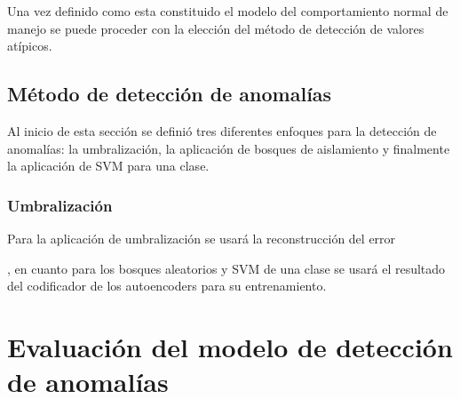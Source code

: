 \vspace{5mm} %

Una vez definido como esta constituido el modelo del comportamiento normal de manejo se puede proceder con la elecci\'{o}n del m\'{e}todo de detecci\'{o}n de valores at\'{i}picos.

\subsection{M\'{e}todo de detecci\'{o}n de anomal\'{i}as}

Al inicio de esta secci\'{o}n se defini\'{o} tres diferentes enfoques para la detecci\'{o}n de anomal\'{i}as: la umbralizaci\'{o}n, la aplicaci\'{o}n de bosques de aislamiento y finalmente la aplicaci\'{o}n de SVM para una clase.

\vspace{5mm} %

\subsubsection{Umbralizaci\'{o}n}

Para la aplicaci\'{o}n de umbralizaci\'{o}n se usar\'{a} la reconstrucci\'{o}n del error

, en cuanto para los bosques aleatorios y SVM de una clase se usar\'{a} el resultado del codificador de los autoencoders para su entrenamiento.


\section{Evaluaci\'{o}n del modelo de detecci\'{o}n de anomal\'{i}as}

